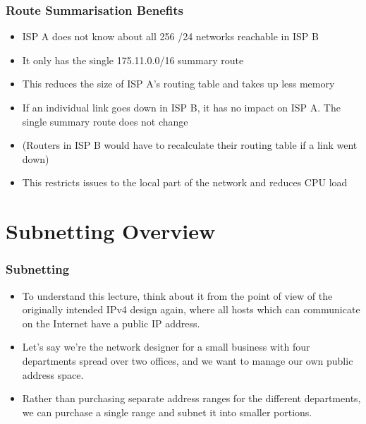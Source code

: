 \documentclass[pdflatex,compress]{beamer}
\begin{document}
\begin{frame}
	\frametitle{Route Summarisation Benefits}
	\begin{itemize}
		\item ISP A does not know about all 256 /24 networks reachable in ISP B
		\item It only has the single 175.11.0.0/16 summary route
		\item This reduces the size of ISP A’s routing table and takes up less memory
		\item If an individual link goes down in ISP B, it has no impact on ISP A. The single summary route does not change
		\item (Routers in ISP B would have to recalculate their routing table if a link went down)
		\item This restricts issues to the local part of the network and reduces CPU load
	\end{itemize}
\end{frame}

\section{Subnetting Overview}

\begin{frame}
	\frametitle{Subnetting}
	\begin{itemize}
		\item To understand this lecture, think about it from the point of view of the originally intended IPv4 design again, where all hosts which can communicate on the Internet have a public IP address.
		\item Let’s say we’re the network designer for a small business with four departments spread over two offices, and we want to manage our own public address space.
		\item Rather than purchasing separate address ranges for the different departments, we can purchase a single range and subnet it into smaller portions.
	\end{itemize}
\end{frame}
\end{document}
